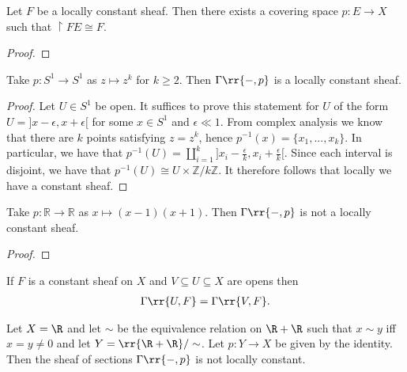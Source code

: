 \documentclass{article}
\begin{document}
\begin{theorem}
  Let $F$ be a locally constant sheaf. Then there exists a covering space
  $p:E\to X$ such that $\restriction{F}{E} \cong F$.
  \begin{proof}
    \missingproof
  \end{proof}
\end{theorem}

\begin{example}
  Take $p:S^1 \to S^1$ as $z\mapsto z^k$ for $k\geq 2$.
  Then $\Gamma\rr{-,p}$ is a locally constant sheaf.
  \begin{proof}
    Let $U \in S^1$ be open. It suffices to prove this statement for $U$ of the form $U = ]x - \epsilon, x + \epsilon[$ for some $x \in S^1$ and $\epsilon \ll 1$. From complex analysis we know that there are $k$ points satisfying $z = z^k$, hence $p^{-1}(x) = \{x_1, ..., x_k\}$. In particular, we have that $p^{-1}(U) = \amalg_{i=1}^k ]x_i - \frac{\epsilon}{k}, x_i + \frac{\epsilon}{k}[$. Since each interval is disjoint, we have that $p^{-1}(U) \cong U \times \mathbb{Z}/k\mathbb{Z}$. It therefore follows that locally we have a constant sheaf.
\missingproof
{}
  \end{proof}
\end{example}

\begin{nonexample}
 Take $p: \mathbb{R} \to \mathbb{R}$ as $x \mapsto (x-1)(x+1)$.
  Then $\Gamma\rr{-,p}$ is not a locally constant sheaf.
  \begin{proof}
    \missingproof
  \end{proof}
\end{nonexample}

\begin{lemma}
  If $F$ is a constant sheaf on $X$ and $V\subseteq U\subseteq X$ are opens then
  \begin{align*}
    \Gamma\rr{U, F} = \Gamma\rr{V,F}.
  \end{align*}
\end{lemma}

\begin{example}
  Let $X=\R$ and let $\sim$ be the equivalence relation on $\R+\R$ such that
  $x\sim y$ iff $x=y\neq 0$ and let $Y=\rr{\R+\R}/\sim$. Let $p:Y\to X$ be
  given by the identity. Then the sheaf of sections $\Gamma\rr{-,p}$
  is not locally constant.
\end{example}
\end{document}

